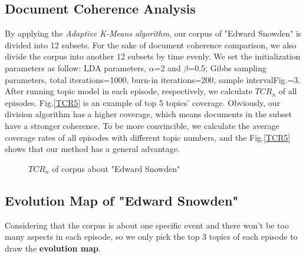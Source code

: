 \documentclass[runningheads,a4paper]{llncs}
\begin{document}
\subsection{Document Coherence Analysis}
\label{section5.2}
By applying the \emph{Adaptive K-Means algorithm}, our corpus of "Edward Snowden" is divided into 12 subsets. For the sake of document coherence comparison, we also divide the corpus into another 12 subsets by time evenly. We set the initialization parameters as follow: LDA parameters, $\alpha$=2 and $\beta$=0.5; Gibbs sampling parameters, total iterations=1000, burn-in iterations=200, sample intervalFig.=3. After running topic model in each episode, respectively, we calculate $TCR_n$ of all episodes. Fig.\ref{TCR5} is an example of top 5 topics' coverage. Obviously, our division algorithm has a higher coverage, which means documents in the subset have a stronger coherence. To be more convincible, we calculate the average coverage rates of all episodes with different topic numbers, and the Fig.\ref{TCR5} shows that our method has a general advantage.
\begin{figure}[htb]
	\centering
	\caption{$TCR_n$ of corpus about "Edward Snowden"}
	\label{TCR}
\end{figure}

\subsection{Evolution Map of "Edward Snowden"}
\label{section5.3}
Considering that the corpus is about one specific event and there won't be too many aspects in each episode, so we only pick the top 3 topics of each episode to draw the \textbf{evolution map}.
\end{document}
